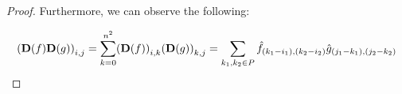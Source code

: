 \begin{proof}


Furthermore, we can observe the following:

\begin{equation*}
    \leftmat \mathbf{D}(f) \mathbf{D}(g) \rightmat_{i, j} = \sum_{k = 0}^{n^2} \leftmat\mathbf{D}(f)\rightmat_{i, k} \leftmat\mathbf{D}(g)\rightmat_{k, j}  = \sum_{k_1, k_2 \in P} \hat{f}_{(k_1-i_1),(k_2-i_2)} \hat{g}_{(j_1-k_1),(j_2-k_2)}
\end{equation*}


\end{proof}
